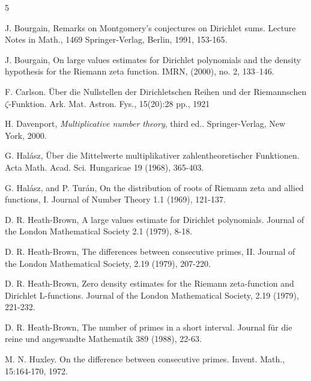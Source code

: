 \documentclass{amsart}
\theoremstyle{plain}
\numberwithin{equation}{section}
\begin{document}



\begin{thebibliography}{5}

 J. Bourgain, Remarks on Montgomery's conjectures on Dirichlet sums. Lecture Notes in Math., 1469 Springer-Verlag, Berlin, 1991, 153-165.


 J. Bourgain, On large values estimates for Dirichlet polynomials and the density hypothesis for the Riemann zeta function. IMRN,
(2000), no. 2, 133–146.

 F. Carlson. \"Uber die Nullstellen der Dirichletschen Reihen und der Riemannschen $\zeta$-Funktion. Ark. Mat.
Astron. Fys., 15(20):28 pp., 1921

 H. Davenport, {\it Multiplicative number theory}, third ed.. Springer-Verlag, New York, 2000.


 G. Hal\'asz, \"Uber die Mittelwerte multiplikativer zahlentheoretischer Funktionen. Acta Math. Acad. Sci. Hungaricae 19 (1968), 365-403.

 G. Hal\'asz,  and P.  Tur\'an, On the distribution of roots of Riemann zeta and allied functions, I.  Journal of Number Theory 1.1 (1969), 121-137.

 D. R. Heath-Brown,  A large values estimate for Dirichlet polynomials. Journal of the London Mathematical Society 2.1 (1979), 8-18.

 D. R. Heath-Brown, The differences between consecutive primes, II. Journal of the London Mathematical Society, 2.19 (1979), 207-220.

 D. R. Heath-Brown, Zero density estimates for the Riemann zeta-function and Dirichlet L-functions. Journal of the London Mathematical Society, 2.19 (1979), 221-232.

 D. R. Heath-Brown, The number of primes in a short interval. Journal für die reine und angewandte Mathematik 389 (1988), 22-63.

 M. N. Huxley.  On the difference between consecutive primes. Invent. Math., 15:164-170, 1972.


\end{thebibliography}
\end{document}
